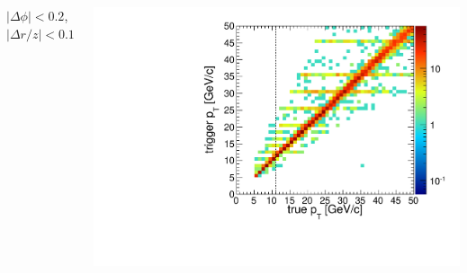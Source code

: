 \documentclass[compress]{beamer}
\begin{document}
\begin{frame}
\begin{columns}
\centering $|\Delta \phi| < 0.2$, $|\Delta r/z| < 0.1$

\includegraphics[width=\linewidth]{trigger_resolution_close.pdf}

\end{columns}
\end{frame}
\end{document}
